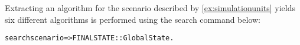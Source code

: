 \begin{example}
  Extracting an algorithm for the scenario described by \cref{ex:simulationunits} yields six different algorithms is performed using the search command below:

  \small
  \begin{alltt}
    search scenario => FINALSTATE::GlobalState .
  \end{alltt}
  \normalsize





\end{example}

